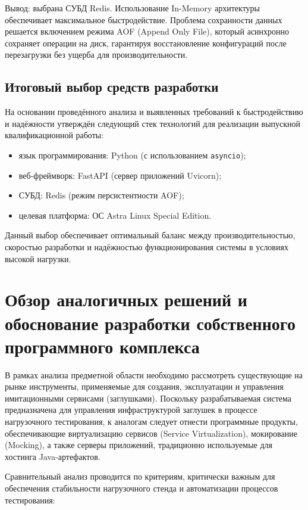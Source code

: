 Вывод: выбрана СУБД Redis. Использование In-Memory архитектуры обеспечивает максимальное быстродействие. Проблема сохранности данных решается включением режима AOF (Append Only File), который асинхронно сохраняет операции на диск, гарантируя восстановление конфигураций после перезагрузки без ущерба для производительности.

\subsection{Итоговый выбор средств разработки}

На основании проведённого анализа и выявленных требований к быстродействию и надёжности утверждён следующий стек технологий для реализации выпускной квалификационной работы:

\begin{itemize}
\item язык программирования: Python (с использованием \texttt{asyncio});
\item веб-фреймворк: FastAPI (сервер приложений Uvicorn);
\item СУБД: Redis (режим персистентности AOF);
\item целевая платформа: ОС Astra Linux Special Edition.
\end{itemize}

Данный выбор обеспечивает оптимальный баланс между производительностью, скоростью разработки и надёжностью функционирования системы в условиях высокой нагрузки.

\section{Обзор аналогичных решений и обоснование разработки собственного программного комплекса}

В рамках анализа предметной области необходимо рассмотреть существующие на рынке инструменты, применяемые для создания, эксплуатации и управления имитационными сервисами (заглушками). Поскольку разрабатываемая система предназначена для управления инфраструктурой заглушек в процессе нагрузочного тестирования, к аналогам следует отнести программные продукты, обеспечивающие виртуализацию сервисов (Service Virtualization), мокирование (Mocking), а также серверы приложений, традиционно используемые для хостинга Java-артефактов.

Сравнительный анализ проводится по критериям, критически важным для обеспечения стабильности нагрузочного стенда и автоматизации процессов тестирования:

